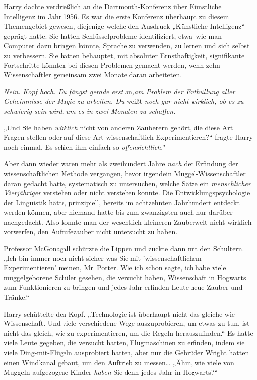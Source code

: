 {Harry dachte verdrießlich an die Dartmouth-Konferenz über Künstliche Intelligenz im Jahr 1956. Es war die erste Konferenz überhaupt zu diesem Themengebiet gewesen, diejenige welche den Ausdruck „Künstliche Intelligenz“ geprägt hatte. Sie hatten Schlüsselprobleme identifiziert, etwa, wie man Computer dazu bringen könnte, Sprache zu verwenden, zu lernen und sich selbst zu verbessern. Sie hatten behauptet, mit absoluter Ernsthaftigkeit, signifikante Fortschritte könnten bei diesen Problemen gemacht werden, wenn zehn Wissenschaftler gemeinsam zwei Monate daran arbeiteten.

\emph{Nein. Kopf hoch. Du fängst gerade erst} an\emph{,am Problem der Enthüllung aller Geheimnisse der Magie zu arbeiten. Du} weißt \emph{noch gar nicht wirklich, ob es zu schwierig sein wird, um es in zwei Monaten zu schaffen.}

„Und Sie haben \emph{wirklich} nicht von anderen Zauberern gehört, die diese Art Fragen stellen oder auf diese Art wissenschaftlich Experimentieren?“ fragte Harry noch einmal. Es schien ihm einfach so \emph{offensichtlich}."

Aber dann wieder waren mehr als zweihundert Jahre \emph{nach} der Erfindung der wissenschaftlichen Methode vergangen, bevor irgendein Muggel-Wissenschaftler daran gedacht hatte, systematisch zu untersuchen, welche Sätze ein \emph{menschlicher Vierjähriger} verstehen oder nicht verstehen konnte. Die Entwicklungspsychologie der Linguistik hätte, prinzipiell, bereits im achtzehnten Jahrhundert entdeckt werden können, aber niemand hatte bis zum zwanzigsten auch nur darüber nachgedacht. Also konnte man der wesentlich kleineren Zauberwelt nicht wirklich vorwerfen, den Aufrufezauber nicht untersucht zu haben.

Professor McGonagall schürzte die Lippen und zuckte dann mit den Schultern. „Ich bin immer noch nicht sicher was Sie mit 'wissenschaftlichem Experimentieren' meinen, Mr~Potter. Wie ich schon sagte, ich habe viele muggelgeborene Schüler gesehen, die versucht haben, Wissenschaft in Hogwarts zum Funktionieren zu bringen und jedes Jahr erfinden Leute neue Zauber und Tränke.“

Harry schüttelte den Kopf. „Technologie ist überhaupt nicht das gleiche wie Wissenschaft. Und viele verschiedene Wege auszuprobieren, um etwas zu tun, ist nicht das gleich, wie zu experimentieren, um die Regeln herauszufinden.“ Es hatte viele Leute gegeben, die versucht hatten, Flugmaschinen zu erfinden, indem sie viele Ding-mit-Flügeln ausprobiert hatten, aber nur die Gebrüder Wright hatten einen Windkanal gebaut, um den Auftrieb zu messen… „Ähm, wie viele von Muggeln aufgezogene Kinder \emph{haben} Sie denn jedes Jahr in Hogwarts?“

}
